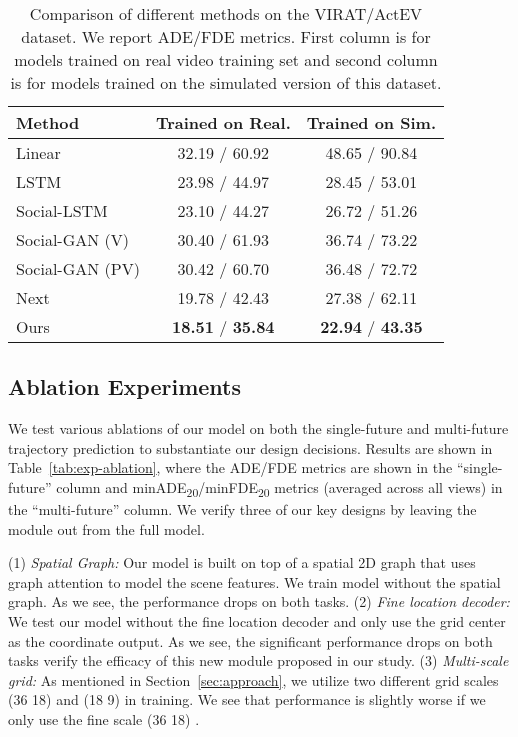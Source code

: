 \documentclass[10pt,twocolumn,letterpaper]{article}
\begin{document}
	
\begin{table}[]
\centering
\small
\begin{tabular}{l||c||c}
\hline
Method & Trained on Real.   & Trained on Sim.        \\ \hline \hline
Linear &  32.19 / 60.92 & 48.65 / 90.84 \\ 
LSTM                &  23.98 / 44.97 & 28.45 / 53.01 \\ 
Social-LSTM \cite{alahi2016social}         &  23.10 / 44.27 & 26.72 / 51.26 \\ 
Social-GAN (V) \cite{gupta2018social}       &  30.40 / 61.93 & 36.74 / 73.22 \\ 
Social-GAN (PV) \cite{gupta2018social}         &  30.42 / 60.70 & 36.48 / 72.72 \\ 
Next ~\cite{liang2019peeking}   & 19.78 / 42.43 & 27.38 / 62.11 \\ 
 Ours & \textbf{18.51} / \textbf{35.84} & \textbf{22.94} / \textbf{43.35} \\ \hline
\end{tabular}
\vspace{-3mm}
\caption{Comparison of different methods on the VIRAT/ActEV dataset.
We report ADE/FDE metrics.
First column  is for models trained on real video training set and
second column 
 is for models trained on the simulated version of this
 dataset.} 
\label{tab:exp-single}
\vspace{-6mm}
\end{table}
 
\vspace{-1mm}
\subsection{Ablation Experiments}
\label{sec:ablation}
\vspace{-1mm}
We test various ablations of our model
on both the single-future and multi-future trajectory prediction to substantiate our design decisions.
Results are shown in Table~\ref{tab:exp-ablation}, where the ADE/FDE metrics are shown in the ``single-future'' column and minADE\textsubscript{20}/minFDE\textsubscript{20} metrics (averaged across all views) in the ``multi-future'' column. We verify three of our key designs by leaving the module out from the full model.


(1) \textit{Spatial Graph:} Our model is built on top of a spatial 2D graph that uses graph attention to model the scene features. We train model without the spatial graph.
As we see, the performance drops on both tasks.
(2) \textit{Fine location decoder:} We test our model without the fine location decoder and only use the grid center as the coordinate output.
As we see, the significant performance drops on both tasks verify the efficacy of this new module proposed in our study. 
(3) \textit{Multi-scale grid:} As mentioned in Section~\ref{sec:approach}, we utilize two different grid scales (36  18) and (18  9) in training.
We see that performance is slightly worse if we only use the fine scale (36  18) .
\end{document}
